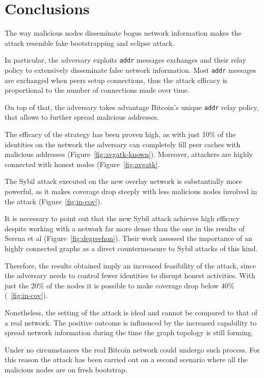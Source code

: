 \chapter{Conclusions}
\label{sec:concl}
The way malicious nodes disseminate bogus network information makes the attack resemble fake bootstrapping and eclipse attack.

In particular, the adversary exploits \texttt{addr} messages exchanges and their relay policy to extensively disseminate false network information. Most \texttt{addr} messages are exchanged when peers setup connections, thus the attack efficacy is proportional to the number of connections made over time.

On top of that, the adversary takes advantage Bitcoin's unique \texttt{addr} relay policy, that allows to further spread malicious addresses.

The efficacy of the strategy has been proven high, as with just 10\% of the identities on the network the adversary can completely fill peer caches with malicious addresses (Figure~\ref{fig:avgatk-known}). Moreover, attackers are highly connected with honest nodes (Figure~\ref{fig:avgatk}.

The Sybil attack executed on the new overlay network is substantially more powerful, as it makes coverage drop steeply with less malicious nodes involved in the attack (Figure~\ref{fig:in-cov}).

It is necessary to point out that the new Sybil attack achieves high efficacy despite working with a network far more dense than the one in the results of Serena et al (Figure~\ref{fig:degreehon}). Their work assessed the importance of an highly connected graphs as a direct countermeasure to Sybil attacks of this kind.

Therefore, the results obtained imply an increased feasibility of the attack, since the adversary needs to control fewer identities to disrupt honest activities. With just the 20\% of the nodes it is possible to make coverage drop below 40\% (~\ref{fig:in-cov}).\par

Nonetheless, the setting of the attack is ideal and cannot be compared to that of a real network. The positive outcome is influenced by the increased capability to spread network information during the time the graph topology is still forming.

Under no circumstances the real Bitcoin network could undergo such process. For this reason the attack has been carried out on a second scenario where all the malicious nodes are on fresh bootstrap.

